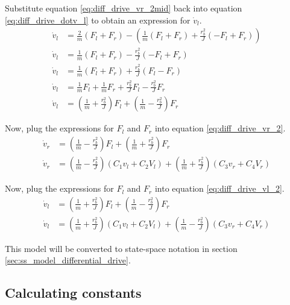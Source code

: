Substitute equation \eqref{eq:diff_drive_vr_2mid} back into equation
\eqref{eq:diff_drive_dotv_l} to obtain an expression for $\dot{v}_l$.
\begin{align}
  \dot{v}_l &= \frac{2}{m} (F_l + F_r) - \left(\frac{1}{m} (F_l + F_r) +
    \frac{r_b^2}{J} (-F_l + F_r)\right) \nonumber \\
  \dot{v}_l &= \frac{1}{m} (F_l + F_r) - \frac{r_b^2}{J} (-F_l + F_r)
    \nonumber \\
  \dot{v}_l &= \frac{1}{m} (F_l + F_r) + \frac{r_b^2}{J} (F_l - F_r) \nonumber
    \\
  \dot{v}_l &= \frac{1}{m} F_l + \frac{1}{m} F_r + \frac{r_b^2}{J} F_l -
    \frac{r_b^2}{J} F_r \nonumber \\
  \dot{v}_l &= \left(\frac{1}{m} + \frac{r_b^2}{J}\right) F_l +
    \left(\frac{1}{m} - \frac{r_b^2}{J}\right) F_r \label{eq:diff_drive_vl_2}
\end{align}

Now, plug the expressions for $F_l$ and $F_r$ into equation
\eqref{eq:diff_drive_vr_2}.
\begin{align}
  \dot{v}_r &= \left(\frac{1}{m} - \frac{r_b^2}{J}\right) F_l +
    \left(\frac{1}{m} + \frac{r_b^2}{J}\right) F_r \nonumber \\
  \dot{v}_r &= \left(\frac{1}{m} - \frac{r_b^2}{J}\right)
    \left(C_1 v_l + C_2 V_l\right) +
    \left(\frac{1}{m} + \frac{r_b^2}{J}\right) \left(C_3 v_r + C_4 V_r\right)
    \label{eq:diff_drive_model_right}
\end{align}

Now, plug the expressions for $F_l$ and $F_r$ into equation
\eqref{eq:diff_drive_vl_2}.
\begin{align}
  \dot{v}_l &= \left(\frac{1}{m} + \frac{r_b^2}{J}\right) F_l +
    \left(\frac{1}{m} - \frac{r_b^2}{J}\right) F_r \nonumber \\
  \dot{v}_l &= \left(\frac{1}{m} + \frac{r_b^2}{J}\right)
    \left(C_1 v_l + C_2 V_l\right) +
    \left(\frac{1}{m} - \frac{r_b^2}{J}\right) \left(C_3 v_r + C_4 V_r\right)
    \label{eq:diff_drive_model_left}
\end{align}

This model will be converted to state-space notation in section
\ref{sec:ss_model_differential_drive}.

\subsection{Calculating constants}

